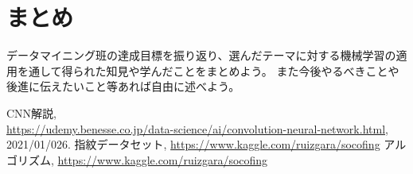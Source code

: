\documentclass[a4paper, 11pt, titlepage]{jsarticle}
\begin{document}
\section{まとめ}
データマイニング班の達成目標を振り返り、選んだテーマに対する機械学習の適用を通して得られた知見や学んだことをまとめよう。
また今後やるべきことや後進に伝えたいこと等あれば自由に述べよう。

\begin{thebibliography}{n}
   CNN解説, \\
  \url{https://udemy.benesse.co.jp/data-science/ai/convolution-neural-network.html}, 2021/01/026.
  指紋データセット, 
  \url{https://www.kaggle.com/ruizgara/socofing}
  アルゴリズム, \url{https://www.kaggle.com/ruizgara/socofing}
  \bibitem{}
\end{thebibliography}
\end{document}
